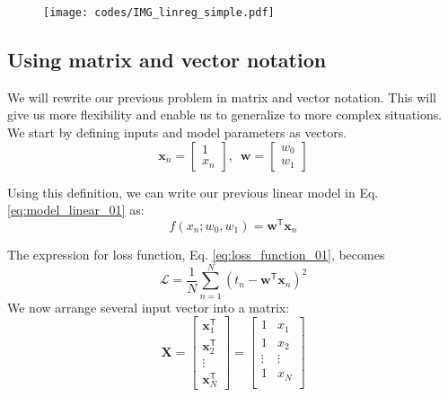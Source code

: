 \documentclass[a4paper,11pt]{article} %
\begin{document}
\begin{figure}[H]
\begin{center}
\texttt{[image: codes/IMG\_linreg\_simple.pdf]}
\end{center}
\end{figure}


\subsection{Using matrix and vector notation}

We will rewrite our previous problem in matrix and vector notation. This will
give us more flexibility and enable us to generalize to more complex situations.
We start by defining inputs and model parameters as vectors.
\begin{equation*}
\mathbf{x}_{n} = \begin{bmatrix}
1 \\
x_{n}
\end{bmatrix}
,\,\,\,%
\mathbf{w} = \begin{bmatrix}
w_{0} \\
w_{1}
\end{bmatrix}
\end{equation*}

Using this definition, we can write our previous linear model in Eq.
\eqref{eq:model_linear_01} as:
\begin{equation}
f(x_n; w_0, w_1) = \mathbf{w}^{\mathsf{T}} \mathbf{x}_{n}
\label{eq:model_linear_02}
\end{equation}

The expression for loss function, Eq. \eqref{eq:loss_function_01}, becomes
\begin{equation}
\mathcal{L} = \frac{1}{N} \sum_{n=1}^{N} \left( t_{n} - \mathbf{w}^{\mathsf{T}}
\mathbf{x}_{n} \right)^2
\label{eq:loss_function_02}
\end{equation}
%
We now arrange several input vector into a matrix:
%
\begin{equation*}
\mathbf{X} = \begin{bmatrix}
\mathbf{x}^{\mathsf{T}}_{1} \\
\mathbf{x}^{\mathsf{T}}_{2} \\
\vdots \\
\mathbf{x}^{\mathsf{T}}_{N}
\end{bmatrix} =
\begin{bmatrix}
1 & x_{1} \\
1 & x_{2} \\
\vdots & \vdots \\
1 & x_{N} \\
\end{bmatrix}
\end{equation*}
\end{document}
